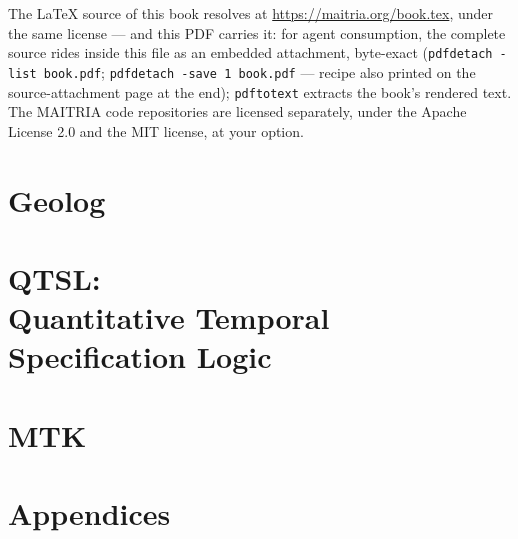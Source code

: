 \documentclass[10pt,a4paper,oneside]{book}
\theoremstyle{definition}
\theoremstyle{plain}
\theoremstyle{remark}
\theoremstyle{definition}
\begin{document}
\doclicenseThis\medskip

\noindent The \LaTeX{} source of this book resolves at
\url{https://maitria.org/book.tex}, under the same license --- and this
PDF carries it: for agent consumption, the complete source rides inside
this file as an embedded attachment, byte-exact
(\texttt{pdfdetach -list book.pdf}; \texttt{pdfdetach -save 1 book.pdf}
--- recipe also printed on the source-attachment page at the end);
\texttt{pdftotext} extracts the book's rendered text.\\[1ex]
The MAITRIA code repositories are licensed separately, under the
Apache License 2.0 and the MIT license, at your option.
\clearpage

\tableofcontents




\clearpage
\edef\bookfolioresume{\number\value{page}}
\mainmatter
\setcounter{page}{\bookfolioresume}




\part{Geolog}





\part[QTSL: Quantitative Temporal Specification Logic]{QTSL:\\ Quantitative Temporal\\ Specification Logic}











\part{MTK}




\appendix
\part{Appendices}


\printbibliography[heading=bibintoc,title={References}]
\end{document}
